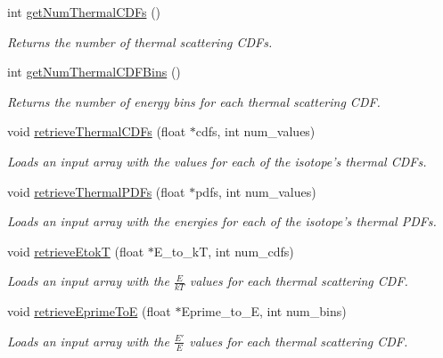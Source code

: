 \begin{DoxyCompactItemize}
int \hyperlink{classIsotope_ab40c21c20dee2ce8ef5141c000076231}{get\-Num\-Thermal\-C\-D\-Fs} ()
\begin{DoxyCompactList}\small\item\em Returns the number of thermal scattering C\-D\-Fs. \end{DoxyCompactList}\item 
int \hyperlink{classIsotope_a6cbecbd23de6df5f156cb4b747de469f}{get\-Num\-Thermal\-C\-D\-F\-Bins} ()
\begin{DoxyCompactList}\small\item\em Returns the number of energy bins for each thermal scattering C\-D\-F. \end{DoxyCompactList}\item 
void \hyperlink{classIsotope_a872fb353ee035c3514fd7a0662f9ce4d}{retrieve\-Thermal\-C\-D\-Fs} (float $\ast$cdfs, int num\-\_\-values)
\begin{DoxyCompactList}\small\item\em Loads an input array with the values for each of the isotope's thermal C\-D\-Fs. \end{DoxyCompactList}\item 
void \hyperlink{classIsotope_abb9e5754658ea5e02556a998186f8161}{retrieve\-Thermal\-P\-D\-Fs} (float $\ast$pdfs, int num\-\_\-values)
\begin{DoxyCompactList}\small\item\em Loads an input array with the energies for each of the isotope's thermal P\-D\-Fs. \end{DoxyCompactList}\item 
void \hyperlink{classIsotope_a50f48611e87e42fd727223676a6d6f5a}{retrieve\-Etok\-T} (float $\ast$E\-\_\-to\-\_\-k\-T, int num\-\_\-cdfs)
\begin{DoxyCompactList}\small\item\em Loads an input array with the $ \frac{E}{kT} $ values for each thermal scattering C\-D\-F. \end{DoxyCompactList}\item 
void \hyperlink{classIsotope_a59bc39b34459d9261fdcf557c1677f70}{retrieve\-Eprime\-To\-E} (float $\ast$Eprime\-\_\-to\-\_\-\-E, int num\-\_\-bins)
\begin{DoxyCompactList}\small\item\em Loads an input array with the $ \frac{E'}{E} $ values for each thermal scattering C\-D\-F. \end{DoxyCompactList}\end{DoxyCompactItemize}
